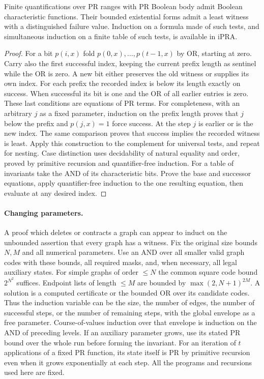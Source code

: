 \begin{lemma}\leavevmode\label{lem:bounded}
Finite quantifications over PR ranges with PR Boolean body admit Boolean
characteristic functions. Their bounded existential forms admit a least
witness with a distinguished failure value. Induction on a formula made of
such tests, and simultaneous induction on a finite table of such tests, is
available in iPRA.
\end{lemma}
\begin{proof}
For a bit $p(i,x)$ fold $p(0,x),\ldots,p(t-1,x)$ by OR, starting at zero.
Carry also the first successful index, keeping the current prefix length
as sentinel while the OR is zero. A new bit either preserves the old witness
or supplies its own index. For each prefix the recorded index is below its
length exactly on success. When successful its bit is one and the OR of all
earlier entries is zero. These last conditions are equations of PR terms.
For completeness, with an arbitrary $j$ as a fixed parameter, induction on
the prefix length proves that $j$ below the prefix and $p(j,x)=1$ force success.
At the step $j$ is earlier or is the new index. The same comparison proves
that success implies the recorded witness is least. Apply this construction
to the complement for universal tests, and repeat for nesting. Case distinction
uses decidability of natural equality and order, proved by primitive recursion
and quantifier-free induction. For a table of invariants take the AND of its
characteristic bits. Prove the base and successor equations, apply quantifier-free
induction to the one resulting equation, then evaluate at any desired index.
\end{proof}

\paragraph{Changing parameters.}
A proof which deletes or contracts a graph can appear to induct on the
unbounded assertion that every graph has a witness. Fix the original size
bounds $N,M$ and all numerical parameters. Use an AND over all smaller valid
graph codes with these bounds, all required masks, and, when necessary, all
legal auxiliary states. For simple graphs of order $\le N$ the common square
code bound $2^{N^2}$ suffices. Endpoint lists of length $\le M$ are bounded by
$\max(2,N+1)^{2M}$. A solution is a computed certificate or the bounded OR
over its candidate codes. Thus the induction variable can be the size,
the number of edges, the number of successful steps, or the number of
remaining steps, with the global envelope as a free parameter. Course-of-values
induction over that envelope is induction on the AND of preceding levels.
If an auxiliary parameter grows, use its stated PR bound over the whole run
before forming the invariant. For an iteration of $t$ applications of a fixed
PR function, its state itself is PR by primitive recursion even when it grows
exponentially at each step. All the programs and recursions used here are fixed.

